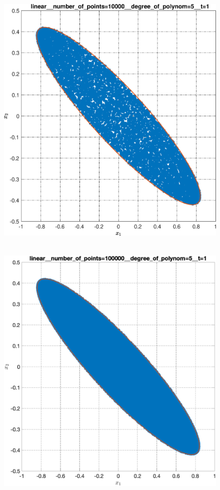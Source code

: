 \documentclass[../main.tex]{subfiles}
\begin{document}
\begin{figure}[ht!]
\begin{minipage}[b]{.3\linewidth}
 		\includegraphics[width=\linewidth]{images/linear__number_of_points=10000__degree_of_polynom=5__t=1.eps}
 	\end{minipage} 
 	\hfill
 	\begin{minipage}[b]{.3\linewidth} 
 		\small
 		\centering
 		\includegraphics[width=\linewidth]{images/linear__number_of_points=100000__degree_of_polynom=5__t=1.eps}

\end{minipage}
\end{figure}
\end{document}
